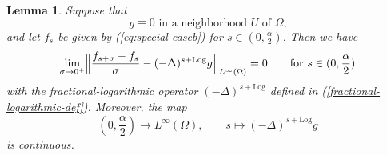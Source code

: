 \documentclass[notitlepage,11pt,reqno]{amsart}
\newtheorem{lemma}[theorem]{Lemma}
\theoremstyle{definition}
\numberwithin{equation}{section}
\begin{document}
\begin{lemma}
\label{diff-express-f-s-disjoint-support}
Suppose that
\begin{equation}
  \label{eq:special-case-3}
\text{$g \equiv 0$ in a neighborhood $U$ of $\Omega$,}   
\end{equation}
and let $f_s$ be given by (\ref{eq:special-caseb}) for $s \in (0,\frac{\alpha}{2})$. Then we have 
  \begin{equation*}
    \label{diff-f-s-general}
  \lim_{\sigma \to 0^+} \Bigl\|\frac{f_{s+\sigma}-f_s}{\sigma}- (-\Delta)^{s+\mathrm{Log}} g\Bigr\|_{L^\infty(\Omega)} = 0 \qquad \text{for $s \in (0,\frac{\alpha}{2})$}  
  \end{equation*}
with the fractional-logarithmic operator $(-\Delta)^{s+\mathrm{Log}}$ defined in (\ref{fractional-logarithmic-def}). Moreover, the map 
\begin{equation}
  \label{eq:add-continuity-map}
(0,\frac{\alpha}{2}) \to L^\infty(\Omega), \qquad s \mapsto (-\Delta)^{s+\mathrm{Log}} g  
\end{equation}
is continuous.
\end{lemma}
\end{document}
